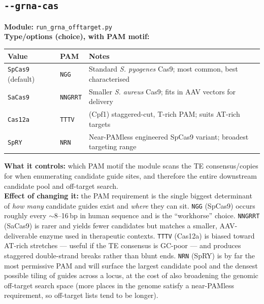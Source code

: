 \documentclass[11pt]{article}
\newcommand{\param}[1]{\subsection*{\texttt{-\/-#1}}}
\begin{document}
\param{grna-cas}
\textbf{Module:} \texttt{run\_grna\_offtarget.py}\\
\textbf{Type/options (choice), with PAM motif:}
\begin{center}
\begin{tabular}{@{}lll@{}}
\toprule
Value & PAM & Notes \\
\midrule
\texttt{SpCas9} (default) & \texttt{NGG} & Standard \emph{S. pyogenes} Cas9; most common, best characterised \\
\texttt{SaCas9} & \texttt{NNGRRT} & Smaller \emph{S. aureus} Cas9; fits in AAV vectors for delivery \\
\texttt{Cas12a} & \texttt{TTTV} & (Cpf1) staggered-cut, T-rich PAM; suits AT-rich targets \\
\texttt{SpRY} & \texttt{NRN} & Near-PAMless engineered SpCas9 variant; broadest targeting range \\
\bottomrule
\end{tabular}
\end{center}
\textbf{What it controls:} which PAM motif the module scans the TE consensus/copies for
when enumerating candidate guide sites, and therefore the entire downstream candidate
pool and off-target search.\\
\textbf{Effect of changing it:} the PAM requirement is the single biggest determinant
of \emph{how many} candidate guides exist and \emph{where} they can sit. \texttt{NGG}
(SpCas9) occurs roughly every $\sim$8--16\,bp in human sequence and is the
``workhorse'' choice. \texttt{NNGRRT} (SaCas9) is rarer and yields fewer candidates but
matches a smaller, AAV-deliverable enzyme used in therapeutic contexts. \texttt{TTTV}
(Cas12a) is biased toward AT-rich stretches — useful if the TE consensus is GC-poor —
and produces staggered double-strand breaks rather than blunt ends. \texttt{NRN}
(SpRY) is by far the most permissive PAM and will surface the largest candidate pool
and the densest possible tiling of guides across a locus, at the cost of also
broadening the genomic off-target search space (more places in the genome satisfy a
near-PAMless requirement, so off-target lists tend to be longer).
\end{document}

